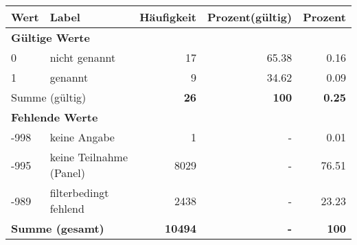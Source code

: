      \begin{longtable}{lXrrr}
     \toprule
     \textbf{Wert} & \textbf{Label} & \textbf{Häufigkeit} & \textbf{Prozent(gültig)} & \textbf{Prozent} \\
     \endhead
     \midrule
     \multicolumn{5}{l}{\textbf{Gültige Werte}}\\

     0 &
     \multicolumn{1}{X}{ nicht genannt   } &


       \num{17} &
       \num[round-mode=places,round-precision=2]{65.38} &
         \num[round-mode=places,round-precision=2]{0.16} \\

     1 &
     \multicolumn{1}{X}{ genannt   } &


       \num{9} &
       \num[round-mode=places,round-precision=2]{34.62} &
         \num[round-mode=places,round-precision=2]{0.09} \\
     \midrule
     \multicolumn{2}{l}{Summe (gültig)} &
       \textbf{\num{26}} &
     \textbf{\num{100}} &
       \textbf{\num[round-mode=places,round-precision=2]{0.25}} \\
     \multicolumn{5}{l}{\textbf{Fehlende Werte}}\\
       -998 &
       keine Angabe &
         \num{1} &
        - &
         \num[round-mode=places,round-precision=2]{0.01} \\
       -995 &
       keine Teilnahme (Panel) &
         \num{8029} &
        - &
         \num[round-mode=places,round-precision=2]{76.51} \\
       -989 &
       filterbedingt fehlend &
         \num{2438} &
        - &
         \num[round-mode=places,round-precision=2]{23.23} \\
     \midrule
     \multicolumn{2}{l}{\textbf{Summe (gesamt)}} &
          \textbf{\num{10494}} &
        \textbf{-} &
        \textbf{\num{100}} \\
     \bottomrule
     \end{longtable}
     
